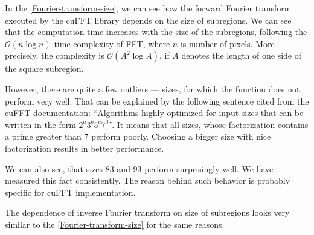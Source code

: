 In the \cref{Fourier-transform-size}, we can see how the forward Fourier transform executed by the cuFFT library depends on the size of subregions. We can see that the computation time increases with the size of the subregions, following the $\mathcal{O}(n \log n)$ time complexity of FFT, where $n$ is number of pixels. More precisely, the complexity is $\mathcal{O}(A^2 \log A)$, if $A$ denotes the length of one side of the square subregion.

However, there are quite a few outliers --- sizes, for which the function does not perform very well. That can be explained by the following sentence cited from the cuFFT documentation: ``Algorithms highly optimized for input sizes that can be written in the form $2^a3^b5^c7^d$''. It means that all sizes, whose factorization contains a prime greater than 7 perform poorly. Choosing a bigger size with nice factorization results in better performance.

We can also see, that sizes 83 and 93 perform surprisingly well. We have measured this fact consistently. The reason behind such behavior is probably specific for cuFFT implementation.

The dependence of inverse Fourier transform on size of subregions looks very similar to the \cref{Fourier-transform-size} for the same reasons.

